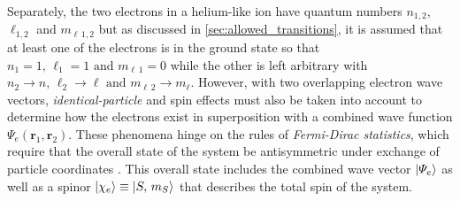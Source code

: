 Separately, the two electrons in a helium-like ion have quantum numbers $n_{1,2}$, $\ell_{1,2}$ and $m_{\ell \, 1,2}$ but as discussed in \cref{sec:allowed_transitions}, it is assumed that at least one of the electrons is in the ground state so that $n_1 = 1, \, \ell_1 = 1 \text{ and } m_{\ell \, 1} = 0$ while the other is left arbitrary with $n_2 \to n, \, \ell_2 \to \ell \text{ and } m_{\ell \, 2} \to m_{\ell}$. 
However, with two overlapping electron wave vectors, \emph{identical-particle} and spin effects must also be taken into account to determine how the electrons exist in superposition with a combined wave function $\Psi_e \left( \mathbold{r}_1, \mathbold{r}_2 \right)$. 
These phenomena hinge on the rules of \emph{Fermi-Dirac statistics}, which require that the overall state of the system be antisymmetric under exchange of particle coordinates \cite{Shankar04,Griffiths05}. 
This overall state includes the combined wave vector $\ket{\Psi_e}$ as well as a spinor $\ket{\chi_e} \equiv \ket{S, \, m_S}$ that describes the total spin of the system. 

